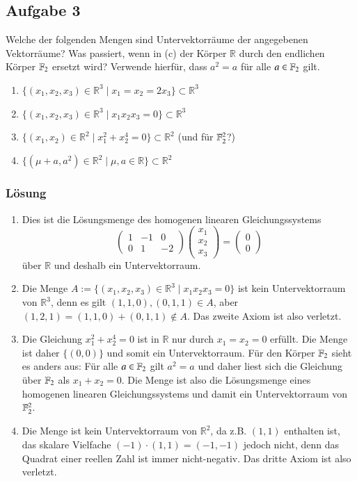 \documentclass[a4paper,10pt]{article}
\newcommand{\R}{\mathbb{R}}
\newcommand{\s}[1]{#1}
\begin{document}
\subsection*{Aufgabe 3}
Welche der folgenden Mengen sind Untervektorräume der angegebenen Vektorräume? 
Was passiert, wenn in (c) der Körper $\R$ durch den endlichen Körper $\Bbb F_2$ ersetzt wird? Verwende hierfür, dass $a^2=a$ für alle $a\in \Bbb F_2$ gilt.
\begin{enumerate}[label=(\alph*)]
\item $\{(x_1,x_2,x_3)\in\R^3 \mid x_1=x_2=2x_3\} \subset \R^3$
\item $\{(x_1,x_2,x_3)\in\R^3 \mid x_1x_2x_3=0\} \subset \R^3$
\item $\{(x_1,x_2)\in\R^2 \mid x_1^2+x_2^4=0\} \subset \R^2$ (und für $\Bbb F_2^2$?)
\item $\{(\mu+a,a^2)\in\R^2 \mid \mu,a\in\R\} \subset \R^2$
\end{enumerate}
\s{\subsubsection*{Lösung}

\begin{enumerate}[label=(\alph*)]

\item Dies ist die Lösungsmenge des homogenen linearen Gleichungssystems
\[
\begin{pmatrix}
1 & -1 & 0 \\
0 & 1 & -2
\end{pmatrix}
\begin{pmatrix}
x_1 \\ x_2 \\ x_3
\end{pmatrix}
=
\begin{pmatrix}
0 \\ 0
\end{pmatrix}
\]
über $\R$ und deshalb ein Untervektorraum.

\item Die Menge $A := \{(x_1,x_2,x_3)\in\R^3 \mid x_1x_2x_3=0\}$ ist kein Untervektorraum von $\R^3$, denn es gilt $(1,1,0),(0,1,1)\in A$, aber $(1,2,1)=(1,1,0)+(0,1,1)\notin A$. Das zweite Axiom ist also verletzt.

\item Die Gleichung $x_1^2+x_2^4=0$ ist in $\R$ nur durch $x_1=x_2=0$ erfüllt. Die Menge ist daher $\{(0,0)\}$ und somit ein Untervektorraum.  
Für den Körper $\Bbb F_2$ sieht es anders aus: Für alle $a\in \Bbb F_2$ gilt $a^2=a$ und daher liest sich die Gleichung über $\Bbb F_2$ als $x_1+x_2=0$. Die Menge ist also die Lösungsmenge eines homogenen linearen Gleichungssystems und damit ein Untervektorraum von $\Bbb F_2^2$.
\item Die Menge ist kein Untervektorraum von $\R^2$, da z.B. $(1,1)$ enthalten ist, das skalare Vielfache $(-1)\cdot(1,1)=(-1,-1)$ jedoch nicht, denn das Quadrat einer reellen Zahl ist immer nicht-negativ. Das dritte Axiom ist also verletzt.  

\end{enumerate}
}
\end{document}
